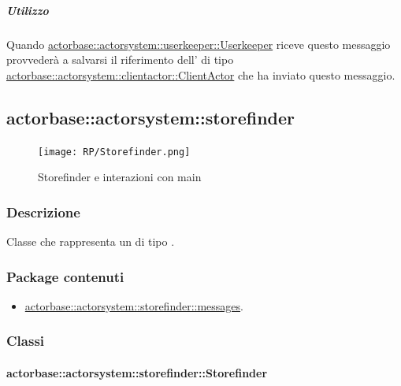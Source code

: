 \documentclass{scalatekids-article}
\begin{document}
\subparagraph{Utilizzo}

Quando \hyperref[sec:actorbase::actorsystem::userkeeper::Userkeeper]{actorbase::\allowbreak{}actorsystem::\allowbreak{}userkeeper::\allowbreak{}Userkeeper}
riceve questo messaggio provvederà a salvarsi il riferimento dell' di tipo
\hyperref[sec:actorbase::actorsystem::clientactor::ClientActor]{actorbase::\allowbreak{}actorsystem::\allowbreak{}clientactor::\allowbreak{}ClientActor}
che ha inviato questo messaggio.

\subsection{actorbase::actorsystem::storefinder}
\label{sec:actorbase::actorsystem::storefinder}

\begin{figure}[H]
  \begin{center}
    \texttt{[image: RP/Storefinder.png]}
    \caption{Storefinder e interazioni con main}
  \end{center}
\end{figure}

\subsubsection{Descrizione}

Classe che rappresenta un  di tipo .

\subsubsection{Package contenuti}

\begin{itemize}

\item \hyperref[sec:actorbase::actorsystem::storefinder::messages]{actorbase::actorsystem::storefinder::messages}.

\end{itemize}

\subsubsection{Classi}

\paragraph{actorbase::actorsystem::storefinder::Storefinder}
\label{sec:actorbase::actorsystem::storefinder::Storefinder}
\end{document}
